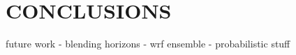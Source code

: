\chapter{CONCLUSIONS}
\label{chap:conc}

future work
- blending horizons
- wrf ensemble
- probabilistic stuff

